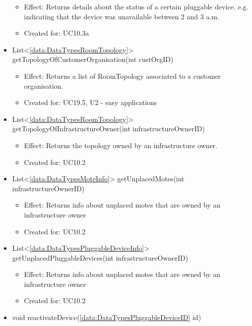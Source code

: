 \begin{description}
\begin{itemize}[noitemsep,nolistsep,leftmargin=-.25cm]
        \begin{itemize}[noitemsep,nolistsep]
           \item Effect: Returns details about the status of a certain pluggable device. e.g. indicating that the device was unavailable between 2 and 3 a.m.
\item Created for: UC10.3a
        \end{itemize}
      \item \textsf{List\textless{}\ref{data:DataTypesRoomTopology}\textgreater{} getTopologyOfCustomerOrganisation(int custOrgID)}
        \begin{itemize}[noitemsep,nolistsep]
           \item Effect: Returns a list of RoomTopology associated to a customer organisation.
\item Created for: UC19.5, U2 - easy applications
        \end{itemize}
      \item \textsf{List\textless{}\ref{data:DataTypesRoomTopology}\textgreater{} getTopologyOfInfrastructureOwner(int infrastructureOwnerID)}
        \begin{itemize}[noitemsep,nolistsep]
           \item Effect: Returns the topology owned by an infrastructure owner.
\item Created for: UC10.2
        \end{itemize}
      \item \textsf{List\textless{}\ref{data:DataTypesMoteInfo}\textgreater{} getUnplacedMotes(int infrastructureOwnerID)}
        \begin{itemize}[noitemsep,nolistsep]
           \item Effect: Returns info about unplaced motes that are owned by an infrastructure owner
\item Created for: UC10.2
        \end{itemize}
      \item \textsf{List\textless{}\ref{data:DataTypesPluggableDeviceInfo}\textgreater{} getUnplacedPluggableDevices(int infrastructureOwnerID)}
        \begin{itemize}[noitemsep,nolistsep]
           \item Effect: Returns info about unplaced motes that are owned by an infrastructure owner
\item Created for: UC10.2
        \end{itemize}
      \item \textsf{void reactivateDevice(\ref{data:DataTypesPluggableDeviceID} id)}

\end{itemize}
\end{description}
